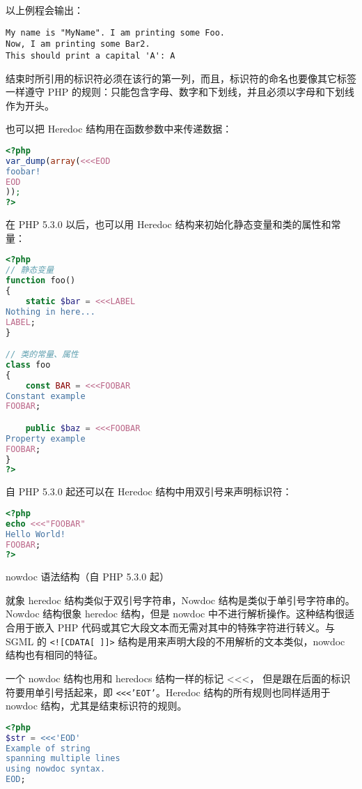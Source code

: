 \begin{compactitem}
以上例程会输出：

\begin{verbatim}
My name is "MyName". I am printing some Foo.
Now, I am printing some Bar2.
This should print a capital 'A': A
\end{verbatim}

结束时所引用的标识符必须在该行的第一列，而且，标识符的命名也要像其它标签一样遵守 PHP 的规则：只能包含字母、数字和下划线，并且必须以字母和下划线作为开头。

也可以把 Heredoc 结构用在函数参数中来传递数据：

\begin{lstlisting}[language=PHP]
<?php
var_dump(array(<<<EOD
foobar!
EOD
));
?>
\end{lstlisting}

在 PHP 5.3.0 以后，也可以用 Heredoc 结构来初始化静态变量和类的属性和常量：

\begin{lstlisting}[language=PHP]
<?php
// 静态变量
function foo()
{
    static $bar = <<<LABEL
Nothing in here...
LABEL;
}

// 类的常量、属性
class foo
{
    const BAR = <<<FOOBAR
Constant example
FOOBAR;

    public $baz = <<<FOOBAR
Property example
FOOBAR;
}
?>
\end{lstlisting}

自 PHP 5.3.0 起还可以在 Heredoc 结构中用双引号来声明标识符：

\begin{lstlisting}[language=PHP]
<?php
echo <<<"FOOBAR"
Hello World!
FOOBAR;
?>
\end{lstlisting}

\item nowdoc 语法结构（自 PHP 5.3.0 起）

就象 heredoc 结构类似于双引号字符串，Nowdoc 结构是类似于单引号字符串的。Nowdoc 结构很象 heredoc 结构，但是 nowdoc 中不进行解析操作。这种结构很适合用于嵌入 PHP 代码或其它大段文本而无需对其中的特殊字符进行转义。与 SGML 的 \texttt{<![CDATA[ ]]>} 结构是用来声明大段的不用解析的文本类似，nowdoc 结构也有相同的特征。

一个 nowdoc 结构也用和 heredocs 结构一样的标记 <<<， 但是跟在后面的标识符要用单引号括起来，即 \texttt{<\/<\/<'EOT'}。Heredoc 结构的所有规则也同样适用于 nowdoc 结构，尤其是结束标识符的规则。

\begin{lstlisting}[language=PHP]
<?php
$str = <<<'EOD'
Example of string
spanning multiple lines
using nowdoc syntax.
EOD;


\end{lstlisting}
\end{compactitem}
